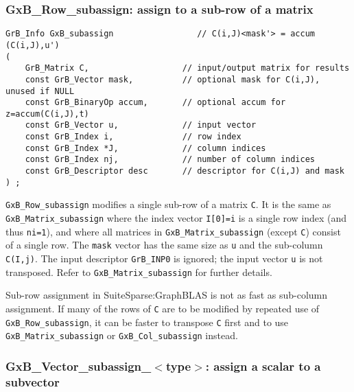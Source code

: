 \documentclass[12pt]{article}
\begin{document}
\subsubsection{{\sf GxB\_Row\_subassign:} assign to a sub-row of a matrix}
\label{subassign_row}

\begin{mdframed}[userdefinedwidth=6in]
{\footnotesize
\begin{verbatim}
GrB_Info GxB_subassign                 // C(i,J)<mask'> = accum (C(i,J),u')
(
    GrB_Matrix C,                   // input/output matrix for results
    const GrB_Vector mask,          // optional mask for C(i,J), unused if NULL
    const GrB_BinaryOp accum,       // optional accum for z=accum(C(i,J),t)
    const GrB_Vector u,             // input vector
    const GrB_Index i,              // row index
    const GrB_Index *J,             // column indices
    const GrB_Index nj,             // number of column indices
    const GrB_Descriptor desc       // descriptor for C(i,J) and mask
) ;
\end{verbatim} } \end{mdframed}

\verb'GxB_Row_subassign' modifies a single sub-row of a matrix \verb'C'.  It is
the same as \verb'GxB_Matrix_subassign' where the index vector \verb'I[0]=i' is
a single row index (and thus \verb'ni=1'), and where all matrices in
\verb'GxB_Matrix_subassign' (except \verb'C') consist of a single row.  The
\verb'mask' vector has the same size as \verb'u' and the sub-column
\verb'C(I,j)'.  The input descriptor \verb'GrB_INP0' is ignored; the input
vector \verb'u' is not transposed.  Refer to \verb'GxB_Matrix_subassign' for
further details.

Sub-row assignment in SuiteSparse:GraphBLAS is not as fast as sub-column
assignment.  If many of the rows of \verb'C' are to be modified by repeated use
of \verb'GxB_Row_subassign', it can be faster to transpose \verb'C' first and
to use \verb'GxB_Matrix_subassign' or \verb'GxB_Col_subassign' instead.

\subsubsection{{\sf GxB\_Vector\_subassign\_$<$type$>$:} assign a scalar to a subvector}
\label{subassign_vector_scalar}
\end{document}
